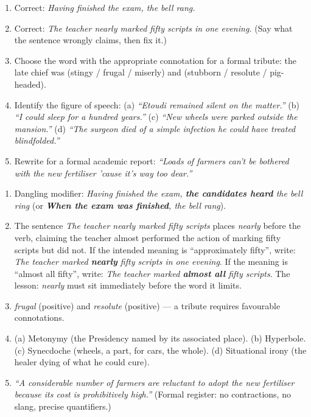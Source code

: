 \documentclass[11pt]{article}
\begin{document}
\begin{exercice}
\begin{enumerate}
\item Correct: \emph{Having finished the exam, the bell rang.}
\item Correct: \emph{The teacher nearly marked fifty scripts in one evening.} (Say what the sentence wrongly claims, then fix it.)
\item Choose the word with the appropriate connotation for a formal tribute: the late chief was (stingy / frugal / miserly) and (stubborn / resolute / pig-headed).
\item Identify the figure of speech: (a) \emph{``Etoudi remained silent on the matter.''} (b) \emph{``I could sleep for a hundred years.''} (c) \emph{``New wheels were parked outside the mansion.''} (d) \emph{``The surgeon died of a simple infection he could have treated blindfolded.''}
\item Rewrite for a formal academic report: \emph{``Loads of farmers can't be bothered with the new fertiliser 'cause it's way too dear.''}
\end{enumerate}
\end{exercice}

\begin{corrige}
\begin{enumerate}
\item Dangling modifier: \emph{Having finished the exam, \textbf{the candidates heard} the bell ring} (or \emph{\textbf{When the exam was finished}, the bell rang}).
\item The sentence \emph{The teacher nearly marked fifty scripts} places \emph{nearly} before the verb, claiming the teacher almost performed the action of marking fifty scripts but did not. If the intended meaning is ``approximately fifty'', write: \emph{The teacher marked \textbf{nearly} fifty scripts in one evening}. If the meaning is ``almost all fifty'', write: \emph{The teacher marked \textbf{almost all} fifty scripts}. The lesson: \emph{nearly} must sit immediately before the word it limits.
\item \emph{frugal} (positive) and \emph{resolute} (positive) — a tribute requires favourable connotations.
\item (a) Metonymy (the Presidency named by its associated place). (b) Hyperbole. (c) Synecdoche (wheels, a part, for cars, the whole). (d) Situational irony (the healer dying of what he could cure).
\item \emph{``A considerable number of farmers are reluctant to adopt the new fertiliser because its cost is prohibitively high.''} (Formal register: no contractions, no slang, precise quantifiers.)
\end{enumerate}
\end{corrige}
\end{document}
